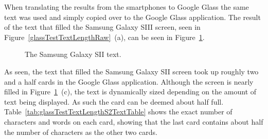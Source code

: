When translating the results from the smartphones to Google Glass the same text was used and simply copied over to the Google Glass application. The result of the text that filled the Samsung Galaxy SIII screen, seen in Figure~\ref{glassTestTextLengthRaw}~(a), can be seen in Figure~\ref{glassTestTextLengthS2Text}. 

	\begin{figure}[H]%
		\centering
   		 \qquad
   		 \qquad
   		 \qquad
		\caption{The Samsung Galaxy SII text.}
		\label{glassTestTextLengthS2Text}
	\end{figure}

As seen, the text that filled the Samsung Galaxy SII screen took up roughly two and a half cards in the Google Glass application. Although the screen is nearly filled in Figure~\ref{glassTestTextLengthS2Text}~(c), the text is dynamically sized depending on the amount of text being displayed. As such the card can be deemed about half full. Table~\ref{tab:glassTestTextLengthS2TextTable} shows the exact number of characters and words on each card, showing that the last card contains about half the number of characters as the other two cards.

